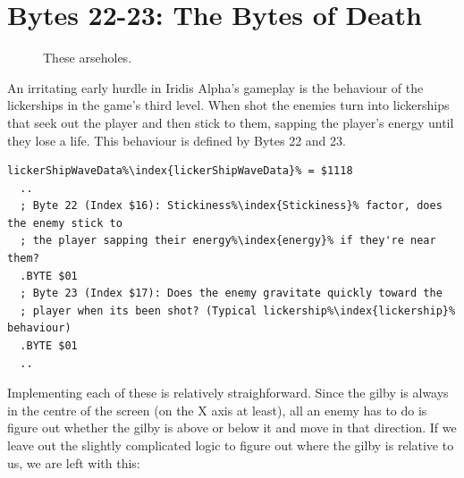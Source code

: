 \section{Bytes 22-23: The Bytes of Death}
\begin{figure}[H]
  {
    \setlength{\tabcolsep}{3.0pt}
    \setlength\cmidrulewidth{\heavyrulewidth} %
	\centering
	\def\MULTICOLORONE{white}
	\def\MULTICOLORTWO{red}
	\def\SPRITECOLOR{gray}
	\begin{subfigure}{0.3\textwidth}
		
	\end{subfigure}
	\begin{subfigure}{0.3\textwidth}
		
	\end{subfigure}
	\begin{subfigure}{0.3\textwidth}
		
	\end{subfigure}
  }\caption[position=top]{These arseholes.}
\end{figure}

An irritating early hurdle in Iridis Alpha's gameplay is the behaviour of the lickerships in the game's third level.
When shot the enemies turn into lickerships that seek out the player and then stick to them, sapping the player's energy
until they lose a life. This behaviour is defined by Bytes 22 and 23. 

\begin{lstlisting}[escapechar=\%]
lickerShipWaveData%\index{lickerShipWaveData}% = $1118
  ..
  ; Byte 22 (Index $16): Stickiness%\index{Stickiness}% factor, does the enemy stick to
  ; the player sapping their energy%\index{energy}% if they're near them?
  .BYTE $01
  ; Byte 23 (Index $17): Does the enemy gravitate quickly toward the
  ; player when its been shot? (Typical lickership%\index{lickership}% behaviour)
  .BYTE $01
  ..
\end{lstlisting}

Implementing each of these is relatively straighforward. Since the gilby is always in the centre of the screen (on the
X axis at least), all an enemy has to do is figure out whether the gilby is above or below it and move in that direction.
If we leave out the slightly complicated logic to figure out where the gilby is relative to us, we are left with this:

